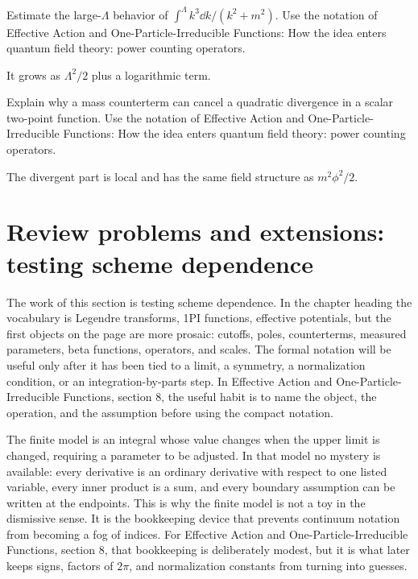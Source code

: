 \begin{exercise}
Estimate the large-\(\Lambda\) behavior of \(\int^\Lambda k^3\dd k/(k^2+m^2)\).  Use the notation of Effective Action and One-Particle-Irreducible Functions: How the idea enters quantum field theory: power counting operators.
\begin{answer}
It grows as \(\Lambda^2/2\) plus a logarithmic term.
\end{answer}
\end{exercise}

\begin{exercise}
Explain why a mass counterterm can cancel a quadratic divergence in a scalar two-point function.  Use the notation of Effective Action and One-Particle-Irreducible Functions: How the idea enters quantum field theory: power counting operators.
\begin{answer}
The divergent part is local and has the same field structure as \(m^2\phi^2/2\).
\end{answer}
\end{exercise}



\section{Review problems and extensions: testing scheme dependence}

The work of this section is testing scheme dependence.  In the chapter heading the vocabulary is Legendre transforms, 1PI functions, effective potentials, but the first objects on the page are more prosaic: cutoffs, poles, counterterms, measured parameters, beta functions, operators, and scales.  The formal notation will be useful only after it has been tied to a limit, a symmetry, a normalization condition, or an integration-by-parts step.  In Effective Action and One-Particle-Irreducible Functions, section 8, the useful habit is to name the object, the operation, and the assumption before using the compact notation.

The finite model is an integral whose value changes when the upper limit is changed, requiring a parameter to be adjusted.  In that model no mystery is available: every derivative is an ordinary derivative with respect to one listed variable, every inner product is a sum, and every boundary assumption can be written at the endpoints.  This is why the finite model is not a toy in the dismissive sense.  It is the bookkeeping device that prevents continuum notation from becoming a fog of indices.  For Effective Action and One-Particle-Irreducible Functions, section 8, that bookkeeping is deliberately modest, but it is what later keeps signs, factors of \(2\pi\), and normalization constants from turning into guesses.

